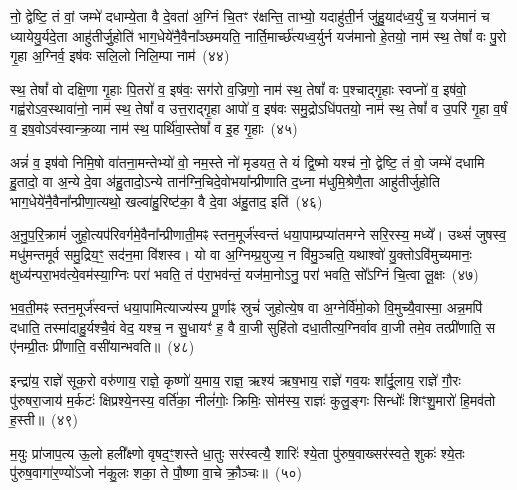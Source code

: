 नो॒ द्वेष्टि॒ तं वां॒ जम्भे॑ दधाम्ये॒ता वै दे॒वता॑ अ॒ग्निं चि॒तꣳ र॑क्षन्ति॒ ताभ्यो॒ यदाहु॑ती॒र्न जु॑हु॒याद॑ध्व॒र्युं च॒ यज॑मानं च ध्यायेयु॒र्यदे॒ता आहु॑तीर्जु॒होति॑ भाग॒धेये॑नै॒वैना᳚ञ्छमयति॒ नार्ति॒मार्च्छ॑त्यध्व॒र्युर्न यज॑मानो हे॒तयो॒ नाम॑ स्थ॒ तेषां᳚ वः पु॒रो गृ॒हा अ॒ग्निर्व॒ इष॑वः सलि॒लो निलि॒म्पा नाम॑~(४४)

स्थ॒ तेषां᳚ वो दक्षि॒णा गृ॒हाः पि॒तरो॑ व॒ इष॑वः॒ सग॑रो व॒ज्रिणो॒ नाम॑ स्थ॒ तेषां᳚ वः प॒श्चाद्गृ॒हाः स्वप्नो॑ व॒ इष॑वो॒ गह्व॑रो\-ऽव॒स्थावा॑नो॒ नाम॑ स्थ॒ तेषां᳚ व उत्त॒राद्गृ॒हा आपो॑ व॒ इष॑वः समु॒द्रो\-ऽधि॑पतयो॒ नाम॑ स्थ॒ तेषां᳚ व उ॒परि॑ गृ॒हा व॒र्\mbox{}षं व॒ इष॒वो\-ऽव॑स्वान्क्र॒व्या नाम॑ स्थ॒ पार्थि॑वा॒स्तेषां᳚ व इ॒ह गृ॒हाः~(४५)

अन्नं॑ व॒ इष॑वो निमि॒षो वा॑तना॒मन्तेभ्यो॑ वो॒ नम॒स्ते नो॑ मृडयत॒ ते यं द्वि॒ष्मो यश्च॑ नो॒ द्वेष्टि॒ तं वो॒ जम्भे॑ दधामि हु॒तादो॒ वा अ॒न्ये दे॒वा अ॑हु॒तादो॒\-ऽन्ये तान॑ग्नि॒चिदे॒वोभया᳚न्प्रीणाति द॒ध्ना म॑धुमि॒श्रेणै॒ता आहु॑तीर्जुहोति भाग॒धेये॑नै॒वैना᳚न्प्रीणा॒त्यथो॒ खल्वा॑हु॒रिष्ट॑का॒ वै दे॒वा अ॑हु॒ताद॒ इति॑~(४६)

अ॒नु॒प॒रि॒क्रामं॑ जुहो॒त्यप॑रिवर्गमे॒वैना᳚न्प्रीणाती॒मꣴ स्तन॒मूर्ज॑स्वन्तं धया॒पाम्प्रप्या॑तमग्ने सरि॒रस्य॒ मध्ये᳚। उथ्सं॑ जुषस्व॒ मधु॑मन्तमूर्व समु॒द्रिय॒ꣳ॒ सद॑न॒मा वि॑शस्व। यो वा अ॒ग्निम्प्र॒युज्य॒ न वि॑मु॒ञ्चति॒ यथाश्वो॑ यु॒क्तो\-ऽवि॑मुच्यमानः॒ क्षुध्य॑न्परा॒भव॑त्ये॒वम॑स्या॒ग्निः परा॑ भवति॒ तं प॑रा॒भव॑न्तं॒ यज॑मा॒नो\-ऽनु॒ परा॑ भवति॒ सो᳚\-ऽग्निं चि॒त्वा लू॒क्षः~(४७)

भ॒व॒ती॒मꣴ स्तन॒मूर्ज॑स्वन्तं धया॒पामित्याज्य॑स्य पू॒र्णाꣴ स्रुचं॑ जुहोत्ये॒ष वा अ॒ग्नेर्वि॑मो॒को वि॒मुच्यै॒वास्मा॒ अन्न॒मपि॑ दधाति॒ तस्मा॑दाहु॒र्यश्चै॒वं वेद॒ यश्च॒ न सु॒धायꣳ॑ ह॒ वै वा॒जी सुहि॑तो दधा॒तीत्य॒ग्निर्वाव वा॒जी तमे॒व तत्प्री॑णाति॒ स ए॑नम्प्री॒तः प्री॑णाति॒ वसी॑यान्भवति॥~(४८)

{\anuvakamend[{प्र॒तीची॒ दिक्तस्या᳚स्ते द्वि॒ष्मो यश्च॑ निलि॒म्पा नामे॒ह गृ॒हा इति॑ लू॒क्षो वसी॑यान्भवति}]}%

इन्द्रा॑य॒ राज्ञे॑ सूक॒रो वरु॑णाय॒ राज्ञे॒ कृष्णो॑ य॒माय॒ राज्ञ॒ ऋश्य॑ ऋष॒भाय॒ राज्ञे॑ गव॒यः शा᳚र्दू॒लाय॒ राज्ञे॑ गौ॒रः पु॑रुषरा॒जाय॑ म॒र्कटः॑ क्षिप्रश्ये॒नस्य॒ वर्ति॑का॒ नीलं॑गोः॒ क्रिमिः॒ सोम॑स्य॒ राज्ञः॑ कुलु॒ङ्गः सिन्धोः᳚ शिꣳशु॒मारो॑ हि॒मव॑तो ह॒स्ती॥~(४९)

{\anuvakamend[{इन्द्रा॑या॒ष्टाविꣳ॑शतिः}]}%

म॒युः प्रा॑जाप॒त्य ऊ॒लो हली᳚क्ष्णो वृषद॒ꣳ॒शस्ते धा॒तुः सर॑स्वत्यै॒ शारिः॑ श्ये॒ता पु॑रुष॒वाख्सर॑स्वते॒ शुकः॑ श्ये॒तः पु॑रुष॒वागा॑र॒ण्यो॑\-ऽजो न॑कु॒लः शका॒ ते पौ॒ष्णा वा॒चे क्रौ॒ञ्चः॥~(५०)


